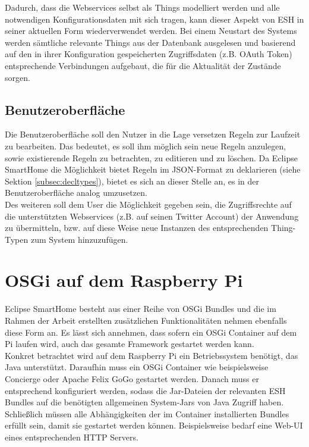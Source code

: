 Dadurch, dass die Webservices selbst als Things modelliert werden und alle notwendigen Konfigurationsdaten mit sich tragen, kann dieser Aspekt von ESH in seiner aktuellen Form wiederverwendet werden. Bei einem Neustart des Systems werden sämtliche relevante Things aus der Datenbank ausgelesen und basierend auf den in ihrer Konfiguration gespeicherten Zugriffsdaten (z.B. OAuth Token) entsprechende Verbindungen aufgebaut, die für die Aktualität der Zustände sorgen.

\subsection{Benutzeroberfläche}
Die Benutzeroberfläche soll den Nutzer in die Lage versetzen Regeln zur Laufzeit zu bearbeiten. Das bedeutet, es soll ihm möglich sein neue Regeln anzulegen, sowie existierende Regeln zu betrachten, zu editieren und zu löschen. Da Eclipse SmartHome die Möglichkeit bietet Regeln im JSON-Format zu deklarieren (siehe Sektion \ref{subsec:decltypes}), bietet es sich an dieser Stelle an, es in der Benutzeroberfläche analog umzusetzen.\\

Des weiteren soll dem User die Möglichkeit gegeben sein, die Zugriffsrechte auf die unterstützten Webservices (z.B. auf seinen Twitter Account) der Anwendung zu übermitteln, bzw. auf diese Weise neue Instanzen des entsprechenden Thing-Typen zum System hinzuzufügen.




\section{OSGi auf dem Raspberry Pi}
\label{sec:deploy}
Eclipse SmartHome besteht aus einer Reihe von OSGi Bundles und die im Rahmen der Arbeit erstellten zusätzlichen Funktionalitäten nehmen ebenfalls diese Form an. Es lässt sich annehmen, dass sofern ein OSGi Container auf dem Pi laufen wird, auch das gesamte Framework gestartet werden kann.\\

Konkret betrachtet wird auf dem Raspberry Pi ein Betriebssystem benötigt, das Java unterstützt. Daraufhin muss ein OSGi Container wie beispielsweise Concierge\cite{concierge} oder Apache Felix GoGo\cite{felixgogo} gestartet werden. Danach muss er entsprechend konfiguriert werden, sodass die Jar-Dateien der relevanten ESH Bundles auf die benötigten allgemeinen System-Jars von Java Zugriff haben. Schließlich müssen alle Abhängigkeiten der im Container installierten Bundles erfüllt sein, damit sie gestartet werden können. Beispielsweise bedarf eine Web-UI eines entsprechenden HTTP Servers.


